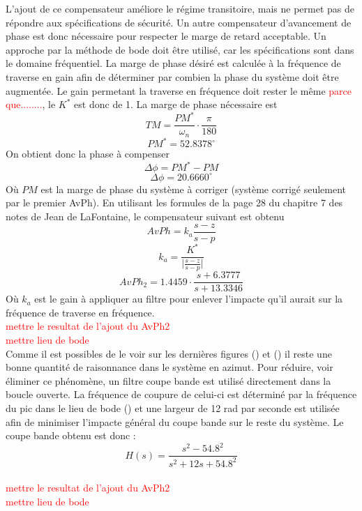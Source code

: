 \documentclass{udes_rapport} %
\begin{document}
L'ajout de ce compensateur améliore le régime transitoire, mais ne permet pas de répondre aux spécifications de sécurité. Un autre compensateur d'avancement de phase est donc nécessaire pour respecter le marge de retard acceptable. Un approche par la méthode de bode doit être utilisé, car les spécifications sont dans le domaine fréquentiel. La marge de phase désiré est calculée à la fréquence de traverse en gain afin de déterminer par combien la phase du système doit être augmentée. Le gain permetant la traverse en fréquence doit rester le même \textcolor{red}{parce que........}, le $K^*$ est donc de 1.
La marge de phase nécessaire est 
\[ TM = \frac{PM^*}{\omega_n}\cdot\frac{\pi}{180}\]
\[PM^* = 52.8378^\circ\]
On obtient donc la phase à compenser
\[\Delta \phi = PM^* - PM \]
\[\Delta \phi = 20.6660^\circ\]
Où $PM$ est la marge de phase du système à corriger (système corrigé seulement par le premier AvPh). En utilisant les formules de la page 28 du chapitre 7 des notes de Jean de LaFontaine, le compensateur suivant est obtenu
\[AvPh = k_a\frac{s-z}{s-p}\]
\[k_a = \frac{K^*}{\vert \frac{s-z}{s-p} \vert}\]
\[ AvPh_2 = 1.4459 \cdot \frac{s+6.3777}{s+13.3346}\]
Où $k_a$ est le gain à appliquer au filtre pour enlever l'impacte qu'il aurait sur la fréquence de traverse en fréquence.
\\
\textcolor{red}{mettre le resultat  de l'ajout du AvPh2}
\\
\textcolor{red}{mettre lieu de bode}
\\
Comme il est possibles de le voir sur les dernières figures () et () il reste une bonne quantité de raisonnance dans le système en azimut. Pour réduire, voir éliminer ce phénomène, un filtre coupe bande est utilisé directement dans la boucle ouverte. La fréquence de coupure de celui-ci est déterminé par la fréquence du pic dans le lieu de bode () et une largeur de 12 rad par seconde est utilisée afin de minimiser l'impacte général du coupe bande sur le reste du système. Le coupe bande obtenu est donc :
\[H(s) = \frac{s^2 - 54.8^2}{s^2 + 12s + 54.8^2}\]
\\
\textcolor{red}{mettre le resultat  de l'ajout du AvPh2}
\\
\textcolor{red}{mettre lieu de bode}
\\
\end{document}
